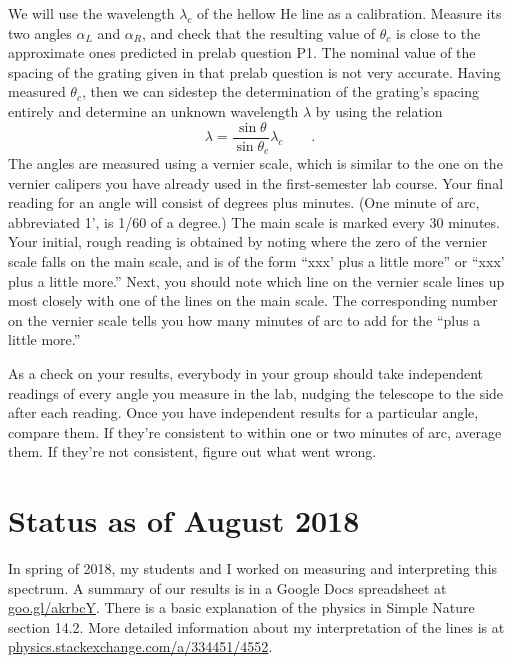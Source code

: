 We will use the wavelength $\lambda_c$ of the hellow He line as a calibration. Measure its two
angles $\alpha_L$ and $\alpha_R$, and check that the resulting value of $\theta_c$ is
close to the approximate ones predicted in prelab question P1. The nominal value of the
spacing of the grating given in that prelab question is not very accurate.
Having measured $\theta_c$,
then we can sidestep the determination of the grating's spacing entirely 
and determine an unknown wavelength $\lambda$
by using the relation
\begin{equation*}
  \lambda = \frac{\sin\theta}{\sin\theta_c} \lambda_c \qquad .
\end{equation*}
The angles are measured using a vernier scale, which
is similar to the one on the vernier calipers you have
already used in the first-semester lab course. Your final
reading for an angle will consist of degrees plus minutes.
(One minute of arc, abbreviated 1', is 1/60 of a degree.)
The main scale is marked every 30 minutes. Your initial,
rough reading is obtained by noting where the zero of the
vernier scale falls on the main scale, and is of the form
``xxx' plus a little more'' or ``xxx'
plus a little more.'' Next, you should note which line on
the vernier scale lines up most closely with one of the
lines on the main scale. The corresponding number on the
vernier scale tells you how many minutes of arc to add for
the ``plus a little more.''

As a check on your results,
everybody in your group should take independent readings of every
angle you measure in the lab, nudging the telescope to the side after
each reading. Once you have independent results for a particular angle,
compare them. If they're consistent to within one or two minutes of
arc, average them. If they're not consistent, figure out what went
wrong.

\section*{Status as of August 2018}

In spring of 2018, my students and I worked on measuring and
interpreting this spectrum. 
A summary of our results is in a Google
Docs spreadsheet at \url{goo.gl/akrbcY}.
There is a basic explanation of
the physics in Simple Nature section 14.2.  More detailed information about my
interpretation of the lines is at\\
\url{physics.stackexchange.com/a/334451/4552}.

